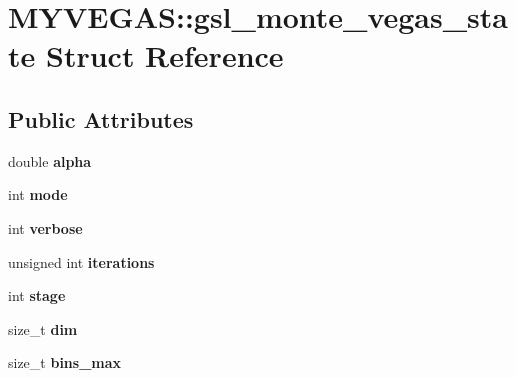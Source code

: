 \hypertarget{structMYVEGAS_1_1gsl__monte__vegas__state}{\section{M\-Y\-V\-E\-G\-A\-S\-:\-:gsl\-\_\-monte\-\_\-vegas\-\_\-state Struct Reference}
\label{structMYVEGAS_1_1gsl__monte__vegas__state}
}
\subsection*{Public Attributes}
\begin{DoxyCompactItemize}
\item 
\hypertarget{structMYVEGAS_1_1gsl__monte__vegas__state_a393ab7ac68cee4a906bba0d4534e46e7}{double {\bfseries alpha}}\label{structMYVEGAS_1_1gsl__monte__vegas__state_a393ab7ac68cee4a906bba0d4534e46e7}

\item 
\hypertarget{structMYVEGAS_1_1gsl__monte__vegas__state_a159d0356d4c809c00c4b2fc8401edf30}{int {\bfseries mode}}\label{structMYVEGAS_1_1gsl__monte__vegas__state_a159d0356d4c809c00c4b2fc8401edf30}

\item 
\hypertarget{structMYVEGAS_1_1gsl__monte__vegas__state_ae03bfd4de6658f297ecfcd59c75085b5}{int {\bfseries verbose}}\label{structMYVEGAS_1_1gsl__monte__vegas__state_ae03bfd4de6658f297ecfcd59c75085b5}

\item 
\hypertarget{structMYVEGAS_1_1gsl__monte__vegas__state_a7387c81259a1b8756ef838a24d04110c}{unsigned int {\bfseries iterations}}\label{structMYVEGAS_1_1gsl__monte__vegas__state_a7387c81259a1b8756ef838a24d04110c}

\item 
\hypertarget{structMYVEGAS_1_1gsl__monte__vegas__state_a5223629e49b596097de6cd58c41a413d}{int {\bfseries stage}}\label{structMYVEGAS_1_1gsl__monte__vegas__state_a5223629e49b596097de6cd58c41a413d}

\item 
\hypertarget{structMYVEGAS_1_1gsl__monte__vegas__state_a9cd28e1764708df743917079c8bf7a57}{size\-\_\-t {\bfseries dim}}\label{structMYVEGAS_1_1gsl__monte__vegas__state_a9cd28e1764708df743917079c8bf7a57}

\item 
\hypertarget{structMYVEGAS_1_1gsl__monte__vegas__state_aa1a052165d8fd075a856dc3c7fee7cfa}{size\-\_\-t {\bfseries bins\-\_\-max}}\label{structMYVEGAS_1_1gsl__monte__vegas__state_aa1a052165d8fd075a856dc3c7fee7cfa}


\end{DoxyCompactItemize}
